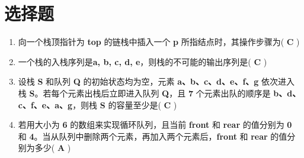 \section{选择题}
    \begin{enumerate}
        \item 向一个栈顶指针为 \textbf{top} 的链栈中插入一个 \textbf{p} 所指结点时，其操作步骤为( \textbf{C} )
        \item 一个栈的入栈序列是\textbf{a, b, c, d, e}，则栈的不可能的输出序列是( \textbf{C} ) 
        \item 设栈 \textbf{S} 和队列 \textbf{Q} 的初始状态均为空，元素 \textbf{a、b、c、d、e、f、g} 依次进⼊栈 \textbf{S}。若每个元素出栈后⽴即进⼊队列 \textbf{Q}，且 \textbf{7} 个元素出队的顺序是 \textbf{b、d、c、f、e、a、g}，则栈 \textbf{S} 的容量⾄少是( \textbf{C} )
        \item 若⽤⼤⼩为 \textbf{6} 的数组来实现循环队列，且当前 \textbf{front} 和 \textbf{rear} 的值分别为 \textbf{0} 和 \textbf{4}。当从队列中删除两个元素，再加⼊两个元素后，\textbf{front} 和 \textbf{rear} 的值分别为多少( \textbf{A} )
\end{enumerate}

